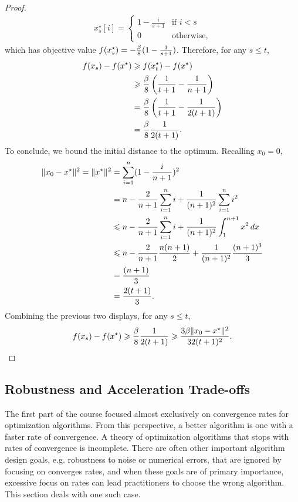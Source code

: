 \begin{proof}
\begin{align*}
    x_s^\star[i] = 
    \begin{cases}
        1- \frac{i}{s + 1} &\text{if } i < s \\
        0 &\text{otherwise},
    \end{cases}
\end{align*}
which has objective value $f(x_s^\star) = -\frac{\beta}{8}(1 - \frac{1}{s + 1} )$.
Therefore, for any $s \leq t$,
\begin{align*}
    f(x_s) - f(x^\star) 
    &\geqslant f(x_t^\star) - f(x^\star) \\
    &\geqslant \frac{\beta}{8} \left(\frac{1}{t+1} - \frac{1}{n+1} \right ) \\
    &= \frac{\beta}{8} \left(\frac{1}{t+1} - \frac{1}{2(t+1)} \right ) \\
    &= \frac{\beta}{8}\frac{1}{2(t+1)}.
\end{align*}
To conclude, we bound the initial distance to the optimum. Recalling $x_0 = 0$,
\begin{align*}
    \lVert x_0 - x^\star\rVert^2 =
    \lVert x^\star\rVert^2 
    &= \sum_{i=1}^n (1 - \frac{i}{n+1} )^2  \\
    &= n - \frac{2}{n+1} \sum_{i=1}^n i + \frac{1}{(n+1)^2} \sum_{i=1}^{n} i^2 \\
    &\leqslant n - \frac{2}{n+1} \sum_{i=1}^n i + \frac{1}{(n+1)^2} \int_1^{n+1} x^2 \, dx \\
    &\leqslant n - \frac{2}{n+1}\frac{n(n+1)}{2} + \frac{1}{(n+1)^2} \frac{(n+1)^3}{3} \\
    &= \frac{(n+1)}{3} \\
    &= \frac{2(t+1)}{3}.
\end{align*}
Combining the previous two displays, for any $s \leq t$,
\begin{align*}
    f(x_s) - f(x^\star)
    \geqslant \frac{\beta}{8}\frac{1}{2(t+1)} 
    \geqslant \frac{3 \beta\lVert x_0 - x^\star\rVert^2}{32(t+1)^2}.
\end{align*}
\end{proof}

\subsection{Robustness and Acceleration Trade-offs}
The first part of the course focused almost exclusively on
convergence rates for optimization algorithms. From this
perspective, a better algorithm is one with a faster rate of convergence.
A theory of optimization algorithms that stops with rates of
convergence is incomplete. There are often other important algorithm design
goals, e.g. robustness to noise or numerical errors, that are ignored by
focusing on converges rates, and when these goals are of primary importance, 
excessive focus on rates can lead practitioners to choose the wrong algorithm.
This section deals with one such case.


